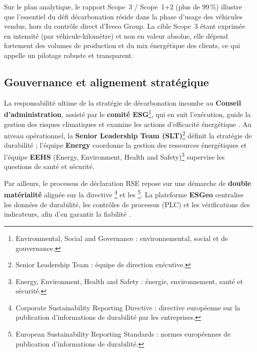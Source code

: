 Sur le plan analytique, le rapport Scope~3 / Scope~1+2 (plus de 99\,\%) illustre que l'essentiel du défi décarbonation réside dans la phase d'usage des véhicules vendus, hors du contrôle direct d'Iveco Group. La cible Scope~3 étant exprimée en intensité (par véhicule-kilomètre) et non en valeur absolue, elle dépend fortement des volumes de production et du mix énergétique des clients, ce qui appelle un pilotage robuste et transparent.

\subsection{Gouvernance et alignement stratégique}

La responsabilité ultime de la stratégie de décarbonation incombe au \textbf{Conseil d'administration}, assisté par le \textbf{comité ESG}\footnote{Environmental, Social and Governance : environnemental, social et de gouvernance.}, qui en suit l'exécution, guide la gestion des risques climatiques et examine les actions d'efficacité énergétique \cite{iveco_annual_2025}. Au niveau opérationnel, la \textbf{Senior Leadership Team (SLT)}\footnote{Senior Leadership Team : équipe de direction exécutive.} définit la stratégie de durabilité ; l'équipe \textbf{Energy} coordonne la gestion des ressources énergétiques et l'équipe \textbf{EEHS} (Energy, Environment, Health and Safety)\footnote{Energy, Environment, Health and Safety : énergie, environnement, santé et sécurité.} supervise les questions de santé et sécurité.

Par ailleurs, le processus de déclaration RSE repose sur une démarche de \textbf{double matérialité} alignée sur la directive \footnote{Corporate Sustainability Reporting Directive : directive européenne sur la publication d'informations de durabilité par les entreprises.} et les \footnote{European Sustainability Reporting Standards : normes européennes de publication d'informations de durabilité.}. La plateforme \textbf{ESGeo} centralise les données de durabilité, les contrôles de processus (PLC) et les vérifications des indicateurs, afin d'en garantir la fiabilité \cite{iveco_annual_2025}.

